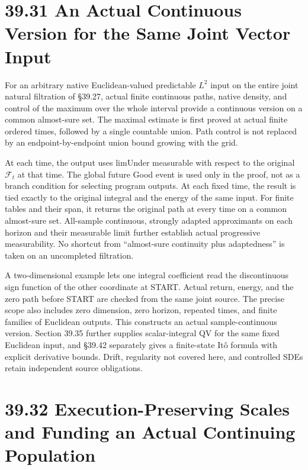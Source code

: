 \documentclass[
  english,
  11pt,
  oneside]{book}
\begin{document}
\section{39.31 An Actual Continuous Version for the Same Joint Vector Input}\label{an-actual-continuous-version-for-the-same-joint-vector-input}

For an arbitrary native Euclidean-valued predictable \(L^2\) input on the entire joint natural filtration of §39.27, actual finite continuous paths, native density, and control of the maximum over the whole interval provide a continuous version on a common almost-sure set. The maximal estimate is first proved at actual finite ordered times, followed by a single countable union. Path control is not replaced by an endpoint-by-endpoint union bound growing with the grid.

At each time, the output uses limUnder measurable with respect to the original \(\mathcal F_t\) at that time. The global future Good event is used only in the proof, not as a branch condition for selecting program outputs. At each fixed time, the result is tied exactly to the original integral and the energy of the same input. For finite tables and their span, it returns the original path at every time on a common almost-sure set. All-sample continuous, strongly adapted approximants on each horizon and their measurable limit further establish actual progressive measurability. No shortcut from ``almost-sure continuity plus adaptedness'' is taken on an uncompleted filtration.

A two-dimensional example lets one integral coefficient read the discontinuous sign function of the other coordinate at START. Actual return, energy, and the zero path before START are checked from the same joint source. The precise scope also includes zero dimension, zero horizon, repeated times, and finite families of Euclidean outputs. This constructs an actual sample-continuous version. Section 39.35 further supplies scalar-integral QV for the same fixed Euclidean input, and §39.42 separately gives a finite-state Itô formula with explicit derivative bounds. Drift, regularity not covered here, and controlled SDEs retain independent source obligations.

\section{39.32 Execution-Preserving Scales and Funding an Actual Continuing Population}\label{execution-preserving-scales-and-funding-an-actual-continuing-population}
\end{document}
